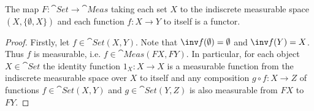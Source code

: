 \documentclass{article}
\begin{document}
\begin{claim*}
	The map $F:\cat{Set}\to\cat{Meas}$ taking each set $X$ to the indiscrete measurable space 
	$(X,\{\emptyset, X\})$ and each function $f:X\to Y$ to itself is a functor.
	\begin{proof}
		Firstly, let $f\in\cat{Set}(X,Y)$. Note that $\inv f(\emptyset)=\emptyset$ and 
		$\inv f(Y)=X$. Thus $f$ is measurable, i.e. $f\in\cat{Meas}(FX, FY)$.
		In particular, for each object $X\in\cat{Set}$ the identity function $1_X:X\to X$ is a measurable 
		function from the indiscrete measurable space over $X$ to itself and any composition $g\circ f:X\to Z$
		of functions $f\in\cat{Set}(X,Y)$ and $g\in\cat{Set}(Y,Z)$ is also measurable from $FX$ to $FY$.
	\end{proof}
\end{claim*}
\end{document}
